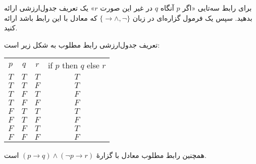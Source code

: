 برای رابط سه‌تایی «اگر $p$ آنگاه $q$ در غیر این صورت $r$» یک تعریف جدول‌ارزشی ارائه بدهید. سپس یک فرمول گزاره‌ای در زبان
$\{\to\wedge,\neg\}$
که معادل با این رابط باشد ارائه کنید.
\begin{ans}
تعریف جدول‌ارزشی رابط مطلوب به شکل زیر است:
\begin{LTR}
        \begin{tabular}{| c | c | c | c |}
          $p$ & $q$ & $r$ & if $p$ then $q$ else $r$ \\
          $T$ & $T$ & $T$ & $T$ \\
          $T$ & $T$ & $F$ & $T$ \\
          $T$ & $F$ & $T$ & $F$ \\
          $T$ & $F$ & $F$ & $F$ \\
          $F$ & $T$ & $T$ & $T$ \\
          $F$ & $T$ & $F$ & $F$ \\
          $F$ & $F$ & $T$ & $T$ \\
          $F$ & $F$ & $F$ & $F$
        \end{tabular}
  \end{LTR}
  همچنین رابط مطلوب معادل با گزارهٔ
  $(p\to q)\wedge(\neg p\to r)$
  است.
\end{ans}
